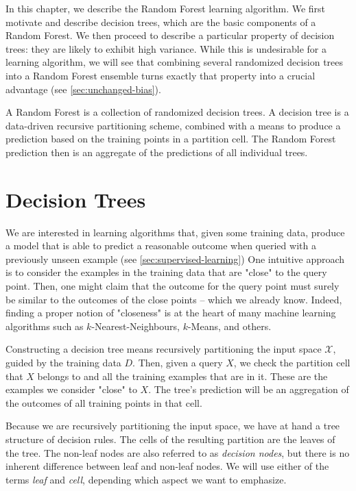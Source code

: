 \documentclass[../main.tex]{subfiles}
\begin{document}
In this chapter, we describe the Random Forest learning algorithm. We first motivate and describe decision trees, which are the basic components of a Random Forest. We then proceed to describe a particular property of decision trees: they are likely to exhibit high variance. While this is undesirable for a learning algorithm, we will see that combining several randomized decision trees into a Random Forest ensemble turns exactly that property into a crucial advantage (see \cref{sec:unchanged-bias}).

A Random Forest is a collection of randomized decision trees. A decision tree is a data-driven recursive partitioning scheme, combined with a means to produce a prediction based on the training points in a partition cell. The Random Forest prediction then is an aggregate of the predictions of all individual trees.

\section{Decision Trees}
\label{sec:decision-trees}

We are interested in learning algorithms that, given some training data, produce a model that is able to predict a reasonable outcome when queried with a previously unseen example (see \cref{sec:supervised-learning})
One intuitive approach is to consider the examples in the training data that are "close" to the query point. Then, one might claim that the outcome for the query point must surely be similar to the outcomes of the close points -- which we already know. Indeed, finding a proper notion of "closeness" is at the heart of many machine learning algorithms such as $k$-Nearest-Neighbours, $k$-Means, and others.

Constructing a decision tree means recursively partitioning the input space $\mathcal{X}$, guided by the training data $D$. Then, given a query $X$, we check the partition cell that $X$ belongs to
 and all the training examples that are in it. These are the examples we consider "close" to $X$. The tree's prediction will be an aggregation of the outcomes of all training points in that cell. 

Because we are recursively partitioning the input space, we have at hand a tree structure of decision rules. The cells of the resulting partition are the leaves of the tree. The non-leaf nodes are also referred to as \textit{decision nodes}, but there is no inherent difference between leaf and non-leaf nodes. We will use either of the terms \textit{leaf} and \textit{cell}, depending which aspect we want to emphasize.
\end{document}
